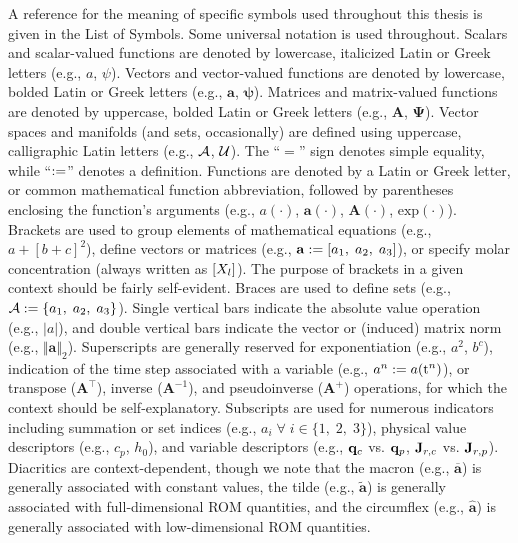 A reference for the meaning of specific symbols used throughout this thesis is given in the List of Symbols. Some universal notation is used throughout. Scalars and scalar-valued functions are denoted by lowercase, italicized Latin or Greek letters (e.g., $a$, $\psi$). Vectors and vector-valued functions are denoted by lowercase, bolded Latin or Greek letters (e.g., $\mathbf{a}$, $\boldsymbol{\psi}$). Matrices and matrix-valued functions are denoted by uppercase, bolded Latin or Greek letters (e.g., $\mathbf{A}$, $\boldsymbol{\Psi}$). Vector spaces and manifolds (and sets, occasionally) are defined using uppercase, calligraphic Latin letters (e.g., $\mathcal{A}$, $\mathcal{U}$). The ``$=$'' sign denotes simple equality, while ``$:=$'' denotes a definition. Functions are denoted by a Latin or Greek letter, or common mathematical function abbreviation, followed by parentheses enclosing the function's arguments (e.g., $a(\cdot)$, $\mathbf{a}(\cdot)$, $\mathbf{A}(\cdot)$, $\text{exp}(\cdot)$). Brackets are used to group elements of mathematical equations (e.g., $a + [b + c]^2$), define vectors or matrices (e.g., $\mathbf{a} := [a_1, \; a_2, \; a_3]$), or specify molar concentration (always written as $[X_{l}]$). The purpose of brackets in a given context should be fairly self-evident. Braces are used to define sets (e.g., $\mathcal{A} := \{a_1,\; a_2,\; a_3\}$). Single vertical bars indicate the absolute value operation (e.g., $|a|$), and double vertical bars indicate the vector or (induced) matrix norm (e.g., $\Vert \mathbf{a} \Vert_2$). Superscripts are generally reserved for exponentiation (e.g., $a^2$, $b^c$), indication of the time step associated with a variable (e.g., $a^{n} := a(\text{t}^{n})$), or transpose ($\mathbf{A}^\top$), inverse ($\mathbf{A}^{-1}$), and pseudoinverse ($\mathbf{A}^+$) operations, for which the context should be self-explanatory. Subscripts are used for numerous indicators including summation or set indices (e.g., $a_{i} \; \forall \; i \in \{1,\; 2,\; 3\}$), physical value descriptors (e.g., $c_p$, $h_0$), and variable descriptors (e.g., $\mathbf{q}_{c}$ vs. $\mathbf{q}_{p}$, $\mathbf{J}_{r,c}$ vs. $\mathbf{J}_{r,p}$). Diacritics are context-dependent, though we note that the macron (e.g., $\mathbf{\overline{a}}$) is generally associated with constant values, the tilde (e.g., $\mathbf{\widetilde{a}}$) is generally associated with full-dimensional ROM quantities, and the circumflex (e.g., $\mathbf{\widehat{a}}$) is generally associated with low-dimensional ROM quantities.